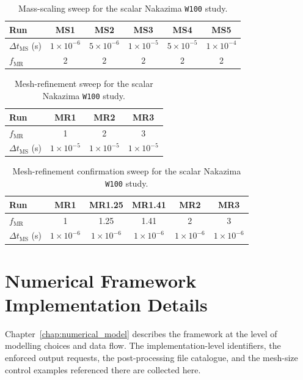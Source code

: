 \begin{table}[ht]
\centering
\begin{tabular}{@{}lccccc@{}}\toprule[1.5pt]
Run & MS1 & MS2 & MS3 & MS4 & MS5 \\ \midrule
$\Delta t_\mathrm{MS}$ (\si{\second}) &
$1\times10^{-6}$ &
$5\times10^{-6}$ &
$1\times10^{-5}$ &
$5\times10^{-5}$ &
$1\times10^{-4}$ \\
$f_\mathrm{MR}$ & 2 & 2 & 2 & 2 & 2 \\
\bottomrule[1.5pt]
\end{tabular}
\caption{Mass-scaling sweep for the scalar Nakazima \texttt{W100} study.}
\label{tab:mass_scaling_sweep}
\end{table}

\begin{table}[ht]
\centering
\begin{tabular}{@{}lccc@{}}\toprule[1.5pt]
Run & MR1 & MR2 & MR3 \\ \midrule
$f_\mathrm{MR}$ & 1 & 2 & 3 \\
$\Delta t_\mathrm{MS}$ (\si{\second}) &
$1\times10^{-5}$ &
$1\times10^{-5}$ &
$1\times10^{-5}$ \\
\bottomrule[1.5pt]
\end{tabular}
\caption{Mesh-refinement sweep for the scalar Nakazima \texttt{W100} study.}
\label{tab:mesh_refinement_sweep}
\end{table}

\begin{table}[ht]
\centering
\begin{tabular}{@{}lccccc@{}}\toprule[1.5pt]
Run & MR1 & MR1.25 & MR1.41 & MR2 & MR3 \\ \midrule
$f_\mathrm{MR}$ & 1 & 1.25 & 1.41 & 2 & 3 \\
$\Delta t_\mathrm{MS}$ (\si{\second}) &
$1\times10^{-6}$ &
$1\times10^{-6}$ &
$1\times10^{-6}$ &
$1\times10^{-6}$ &
$1\times10^{-6}$ \\
\bottomrule[1.5pt]
\end{tabular}
\caption{Mesh-refinement confirmation sweep for the scalar Nakazima \texttt{W100} study.}
\label{tab:mesh_refinement_confirm_sweep}
\end{table}

\section{Numerical Framework Implementation Details}
\label{app:numerical_implementation}

Chapter~\ref{chap:numerical_model} describes the framework at the level of
modelling choices and data flow. The implementation-level identifiers, the
enforced output requests, the post-processing file catalogue, and the
mesh-size control examples referenced there are collected here.

